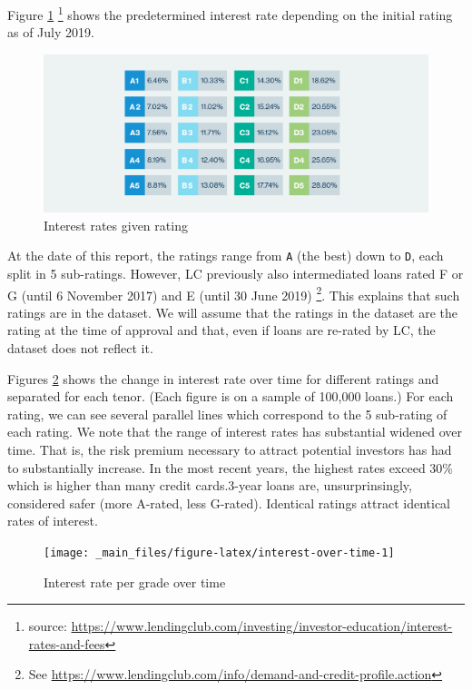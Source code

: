 \documentclass[11pt,]{report}
\let\rmarkdownfootnote\footnote%
\def\footnote{\protect\rmarkdownfootnote}
\begin{document}
Figure \ref{fig:interest-rate-table} \footnote{source: \url{https://www.lendingclub.com/investing/investor-education/interest-rates-and-fees}} shows the predetermined interest rate depending on the initial rating as of July 2019.

\small

\begin{figure}

{\centering \includegraphics[width=0.7\linewidth]{images/interest-rates-jul2019} 

}

\caption{Interest rates given rating}\label{fig:interest-rate-table}
\end{figure}

\normalsize

At the date of this report, the ratings range from \texttt{A} (the best) down to \texttt{D}, each split in 5 sub-ratings. However, LC previously also intermediated loans rated F or G (until 6 November 2017) and E (until 30 June 2019) \footnote{See \url{https://www.lendingclub.com/info/demand-and-credit-profile.action}}. This explains that such ratings are in the dataset. We will assume that the ratings in the dataset are the rating at the time of approval and that, even if loans are re-rated by LC, the dataset does not reflect it.

Figures \ref{fig:interest-over-time} shows the change in interest rate over time for different ratings and separated for each tenor. (Each figure is on a sample of 100,000 loans.) For each rating, we can see several parallel lines which correspond to the 5 sub-rating of each rating. We note that the range of interest rates has substantial widened over time. That is, the risk premium necessary to attract potential investors has had to substantially increase. In the most recent years, the highest rates exceed 30\% which is higher than many credit cards.3-year loans are, unsurprinsingly, considered safer (more A-rated, less G-rated). Identical ratings attract identical rates of interest.

\small

\begin{figure}

{\centering \texttt{[image: \_main\_files/figure-latex/interest-over-time-1]} 

}

\caption{Interest rate per grade over time}\label{fig:interest-over-time}
\end{figure}
\end{document}
